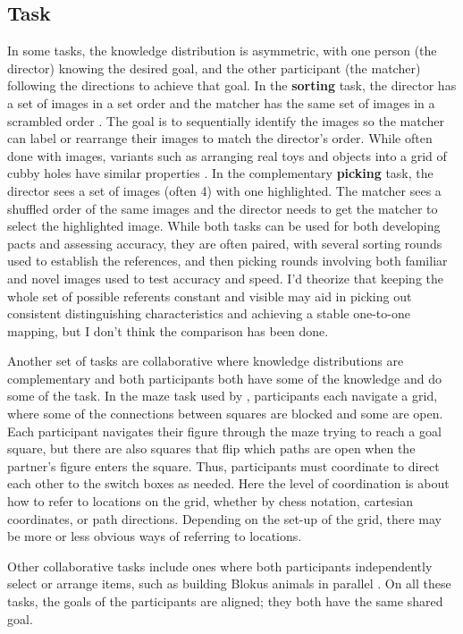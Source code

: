 \documentclass[11pt]{article}
\begin{document}
	\subsection{Task}
	In some tasks, the knowledge distribution is asymmetric, with one person (the director) knowing the desired goal, and the other participant (the matcher) following the directions to achieve that goal. In the \textbf{sorting} task, the director has a set of images in a set order and the matcher has the same set of images in a scrambled order \cite{clarkReferringCollaborativeProcess1986}. The goal is to sequentially identify the images so the matcher can label or rearrange their images to match the director's order. While often done with images, variants such as arranging real toys and objects into a grid of cubby holes have similar properties \cite{metzingWhenConceptualPacts2003}. In the complementary \textbf{picking} task, the director sees a set of images (often 4) with one highlighted. The matcher sees a shuffled order of the same images and the director needs to get the matcher to select the highlighted image. While both tasks can be used for both developing pacts and assessing accuracy, they are often paired, with several sorting rounds used to establish the references, and then picking rounds involving both familiar and novel images used to test accuracy and speed. I'd theorize that keeping the whole set of possible referents constant and visible may aid in picking out consistent distinguishing characteristics and achieving a stable one-to-one mapping, but I don't think the comparison has been done. 
	
	Another set of tasks are collaborative where knowledge distributions are complementary and both participants both have some of the knowledge and do some of the task. In the maze task used by \cite{garrodConversationCoordinationConvention1994}, participants each navigate a grid, where some of the connections between squares are blocked and some are open. Each participant navigates their figure through the maze trying to reach a goal square, but there are also squares that flip which paths are open when the partner's figure enters the square. Thus, participants must coordinate to direct each other to the switch boxes as needed. Here the level of coordination is about how to refer to locations on the grid, whether by chess notation, cartesian coordinates, or path directions. Depending on the set-up of the grid, there may be more or less obvious ways of referring to locations. 
	
	Other collaborative tasks include ones where both participants independently select or arrange items, such as building Blokus animals in parallel \cite{ibarraFlexibilityConceptualPacts2016}. On all these tasks, the goals of the participants are aligned; they both have the same shared goal. 
\end{document}
